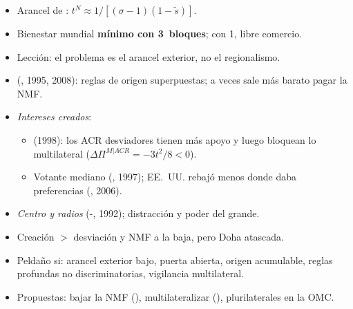 \documentclass{article}
\begin{document}
\begin{columnas}
\begin{itemize}
  \begin{itemize}
  \item Arancel de : $t^N\approx1/[(\sigma-1)(1-\tilde s)]$.
  \item Bienestar mundial \textbf{mínimo con 3~bloques}; con 1, libre comercio.
  \item Lección: el problema es el arancel exterior, no el regionalismo.
  \end{itemize}
\end{itemize}
\begin{itemize}
\item {} (, 1995, 2008): reglas de origen superpuestas; a veces sale más barato pagar la NMF.
\item \emph{Intereses creados}:
  \begin{itemize}
  \item {} (1998): los ACR desviadores tienen más apoyo y luego bloquean lo multilateral ($\Delta\Pi^{M|ACR}=-3t^2/8<0$).
  \item Votante mediano (, 1997); EE.~UU. rebajó menos donde daba preferencias (, 2006).
  \end{itemize}
\item \emph{Centro y radios} (-, 1992); distracción y poder del grande.
\end{itemize}
\begin{itemize}
\item Creación $>$ desviación y NMF a la baja, pero Doha atascada.
\item Peldaño si: arancel exterior bajo, puerta abierta, origen acumulable, reglas profundas no discriminatorias, vigilancia multilateral.
\item Propuestas: bajar la NMF (), multilateralizar (), plurilaterales en la OMC.
\end{itemize}


\end{columnas}
\end{document}
